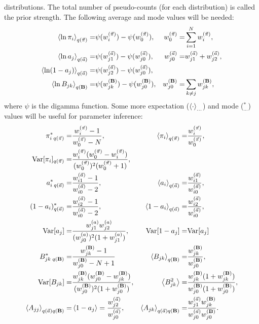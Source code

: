 distributions.  The total number of pseudo-counts (for each
distribution) is called the prior strength. The following average and
mode values will be needed:
\begin{align}
  \left\langle \ln \pi_i\right\rangle_{q(\vec{\pi})}=&\psi(w_i^{(\vec{\pi})})-\psi(w_0^{(\vec{\pi})}),
  &w_0^{(\vec{\pi})}=&\sum_{i=1}^Nw_i^{(\vec{\pi})},\label{lnpiaverage}\\
  \left\langle \ln a_j\right\rangle_{q(\vec{a})}=&\psi(w_{j1}^{(\vec{a})})-\psi(w_{j0}^{(\vec{a})}),&
  w_{j0}^{(\vec{a})}=&w_{j1}^{(\vec{a})}+w_{j2}^{(\vec{a})},\\
  \left\langle \ln (1-a_j)\right\rangle_{q(\vec{a})}=&\psi(w_{j2}^{(\vec{a})})-\psi(w_{j0}^{(\vec{a})}),\\
  \left\langle \ln B_{jk}\right\rangle_{q(\mathbf{B})}=&\psi(w_{jk}^{(\mathbf{B})})
    -\psi(w_{j0}^{(\mathbf{B})}),&
  w_{j0}^{(\mathbf{B})}=&\sum_{k\ne j}w_{jk}^{(\mathbf{B})},
\end{align}
where $\psi$ is the digamma function.  Some more expectation
($\left\langle \cdot\right\rangle_{\ldots}$) and mode ($^*_{\ldots}$) values will be
useful for parameter inference:
\begin{align}
  \pi^*_{i\;q(\vec\pi)}=&\frac{w_i^{(\vec\pi)}-1}{w_0^{(\vec\pi)}-N}, &
  \left\langle \pi_i\right\rangle_{q(\vec{\pi})}=&\frac{w_i^{(\vec\pi)}}{w_0^{(\vec\pi)}}, \\
  \text{Var}[\pi_i]_{q(\vec{\pi})}=&
  \frac{w_i^{(\vec\pi)}(w_0^{(\vec\pi)}-w_i^{(\vec\pi)})}{
    (w_0^{(\vec\pi)})^2(w_0^{(\vec\pi)}+1)},\\
  a^*_{i\;q(\vec a)}=&\frac{w_{i1}^{(\vec{a})}-1}{w_{i0}^{(\vec{a})}-2}, &
  \left\langle a_i\right\rangle_{q(\vec{a})}=&\frac{w_{i1}^{(\vec{a})}}{w_{i0}^{(\vec{a})}},\\
  (1-a_i)^*_{q(\vec{a})}=&\frac{w_{i2}^{(\vec{a})}-1}{w_{i0}^{(\vec{a})}-2}, &
  \left\langle 1-a_i\right\rangle_{q(\vec{a})}=&\frac{w_{i2}^{(\vec{a})}}{w_{i0}^{(\vec{a})}},\\
  \text{Var}[a_j]=&\frac{w_{j1}^{(a)}w_{j2}^{(a)}}{(w_{j0}^{(a)})^2(1+w_{j1}^{(a)})},&
\text{Var}[1-a_j]=&\text{Var}[a_j]\\
  B^*_{jk\;q(\mathbf{B})}=&\frac{w_{jk}^{(\mathbf{B})}-1}{w_{j0}^{(\mathbf{B})}-N+1}&
  \left\langle B_{jk}\right\rangle_{q(\mathbf{B})}=&\frac{w_{jk}^{(\mathbf{B})}}{w_{j0}^{(\mathbf{B})}},\\
\text{Var}[B_{jk}]=&
\frac{w_{jk}^{(\mathbf{B})}(w_{j0}^{(\mathbf{B})}-w_{jk}^{(\mathbf{B})})}{
(w_{j0}^{(\mathbf{B})})^2(1+w_{j0}^{(\mathbf{B})})},&
\left\langle B_{jk}^2\right\rangle=&\frac{w_{jk}^{(\mathbf{B})}(1+w_{jk}^{(\mathbf{B})})}{
        w_{j0}^{(\mathbf{B})}(1+w_{j0}^{(\mathbf{B})})},\\
\left\langle A_{jj}\right\rangle_{q(\vec{a})q(\mathbf{B})}=&
\left\langle 1-a_j\right\rangle=\frac{w_{j2}^{(\vec{a})}}{w_{j0}^{(\vec{a})}},&
\left\langle A_{jk}\right\rangle_{q(\vec{a})q(\mathbf{B})}=&
\frac{w_{j1}^{(\vec{a})}w_{jk}^{(\mathbf{B})}}{w_{j0}^{(\vec{a})}w_{j0}^{(\mathbf{B})}}.\label{Amean}
\end{align}
